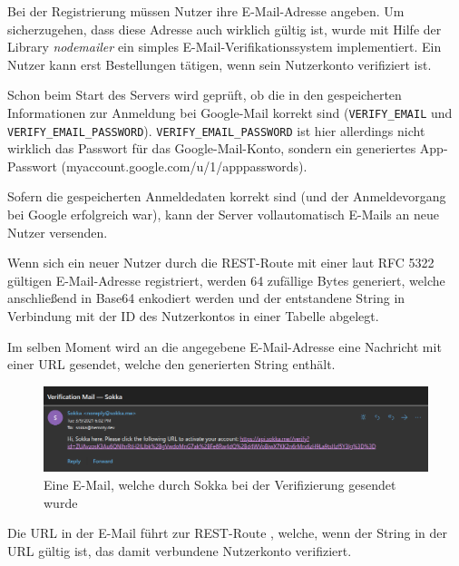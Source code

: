 Bei der Registrierung müssen Nutzer ihre E-Mail-Adresse angeben. Um sicherzugehen, dass diese Adresse auch wirklich gültig ist, wurde mit Hilfe der Library \textit{nodemailer} ein simples E-Mail-Verifikationssystem implementiert. Ein Nutzer kann erst Bestellungen tätigen, wenn sein Nutzerkonto verifiziert ist.

Schon beim Start des Servers wird geprüft, ob die in den \textit{} gespeicherten Informationen zur Anmeldung bei Google-Mail korrekt sind (\lstinline{VERIFY_EMAIL} und \lstinline{VERIFY_EMAIL_PASSWORD}). \lstinline{VERIFY_EMAIL_PASSWORD} ist hier allerdings nicht wirklich das Passwort für das Google-Mail-Konto, sondern ein generiertes App-Passwort (myaccount.google.com/u/1/apppasswords).

Sofern die gespeicherten Anmeldedaten korrekt sind (und der Anmeldevorgang bei Google erfolgreich war), kann der Server vollautomatisch E-Mails an neue Nutzer versenden.

Wenn sich ein neuer Nutzer durch die REST-Route \textit{} mit einer laut RFC 5322 gültigen E-Mail-Adresse registriert, werden 64 zufällige Bytes generiert, welche anschließend in Base64 enkodiert werden und der entstandene String in Verbindung mit der ID des Nutzerkontos in einer Tabelle abgelegt.

Im selben Moment wird an die angegebene E-Mail-Adresse eine Nachricht mit einer URL gesendet, welche den generierten String enthält.

\begin{figure}[htp]
    \begin{center}
        \includegraphics[width=1\textwidth]{images/Backend/mail.png}
        \caption{Eine E-Mail, welche durch Sokka bei der Verifizierung gesendet wurde}
    \end{center}
\end{figure}

Die URL in der E-Mail führt zur REST-Route \textit{}, welche, wenn der String in der URL gültig ist, das damit verbundene Nutzerkonto verifiziert.

